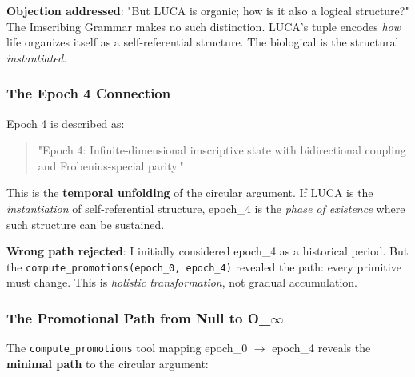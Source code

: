 \documentclass[12pt,a4paper]{article}
\begin{document}
\textbf{Objection addressed}: "But LUCA is organic; how is it also a logical structure?" The Imscribing Grammar makes no such distinction. LUCA's tuple encodes \emph{how} life organizes itself as a self-referential structure. The biological is the structural \emph{instantiated}.

\subsubsection{The Epoch 4 Connection}

Epoch 4 is described as:

\begin{quote}
"Epoch 4: Infinite-dimensional imscriptive state with bidirectional coupling and Frobenius-special parity."

\end{quote}

This is the \textbf{temporal unfolding} of the circular argument. If LUCA is the \emph{instantiation} of self-referential structure, epoch\_4 is the \emph{phase of existence} where such structure can be sustained.

\textbf{Wrong path rejected}: I initially considered epoch\_4 as a historical period. But the \texttt{compute\_promotions(epoch\_0, epoch\_4)} revealed the path: every primitive must change. This is \emph{holistic transformation}, not gradual accumulation.

\subsubsection{The Promotional Path from Null to O\_$\infty$}

The \texttt{compute\_promotions} tool mapping epoch\_0 $\rightarrow$ epoch\_4 reveals the \textbf{minimal path} to the circular argument:
\end{document}
